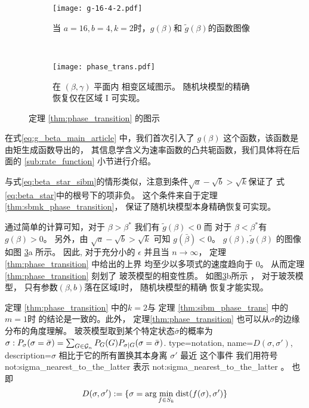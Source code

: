 \begin{figure}[H]
	\begin{subfigure}{0.43\textwidth}
		\texttt{[image: g-16-4-2.pdf]}
		\caption{当 $a=16,b=4,k=2$时，$g(\beta)$和
		$\tilde{g}(\beta)$的函数图像}\label{fig:g}
	\end{subfigure}~
	\begin{subfigure}{0.55\textwidth}
		\texttt{[image: phase\_trans.pdf]}
		\caption{
			在 $(\beta, \gamma)$ 平面内
			相变区域图示。
			随机块模型的精确
			恢复仅在区域 I 可实现。}\label{fig:pt}
	\end{subfigure}
	\caption{定理 \ref{thm:phase_transition}
	的图示}
	\label{fig:phase_transition_theorem_illustration}
\end{figure}
\begin{remark}
	在式\eqref{eq:g_beta_main_article} 中，我们首次引入了
	$g(\beta)$ 这个函数，该函数是由矩生成函数导出的，
	其信息学含义为速率函数的凸共轭函数，我们具体将在后面的 \ref{sub:rate_function} 小节进行介绍。
\end{remark}
与式\eqref{eq:beta_star_sibm}的情形类似，注意到条件$\sqrt{a} - \sqrt{b} > \sqrt{k}$保证了
式\eqref{eq:beta_star}中的根号下的项非负。
这个条件来自于定理\ref{thm:sbmk_phase_transition}，
保证了随机块模型本身精确恢复可实现。


通过简单的计算可知，对于 $\beta> \beta^*$ 我们有
$\tilde{g}(\beta) < 0$ 而 对于 $\beta < \beta^*$有
$g(\beta)>0$。
另外，由 $\sqrt{a} - \sqrt{b} > \sqrt{k}$ 可知
$g(\bar{\beta}) < 0$。
$g(\beta), \tilde{g}(\beta)$ 的图像
如图 \ref{fig:phase_transition_theorem_illustration}a 所示。
因此, 对于充分小的
$\epsilon$ 并且当 $n \to \infty$，
定理\ref{thm:phase_transition} 中给出的上界
均至少以多项式的速度趋向于 $0$。
从而定理\ref{thm:phase_transition} 
刻划了
玻茨模型的相变性质。
如图\ref{fig:phase_transition_theorem_illustration}b所示
， 对于玻茨模型， 只有参数$(\beta, b)$落在区域I时，
随机块模型的精确
恢复才能实现。



定理 \ref{thm:phase_transition} 中的$k=2$与
定理 \ref{thm:sibm_phase_trans} 中的$m=1$时
的结论是一致的。此外，
定理\ref{thm:phase_transition}
也可以从$\sigma$的边缘分布的角度理解。
玻茨模型取到某个特定状态$\bar{\sigma}$的概率为
 $\sigma: P_{\sigma}(\sigma =\bar{\sigma})
=\sum_{G \in \mathcal{G}_n}P_G(G)P_{\sigma |G}(\sigma=\bar{\sigma})$.
{
  type=notation,
  name={\ensuremath{D(\sigma, \sigma')}},
  description={$\sigma$ 相比于它的所有置换其本身离 $\sigma'$ 最近
  这个事件}
}
我们用符号 \gls{not:sigma_nearest_to_the_latter} 表示 \glsdesc{not:sigma_nearest_to_the_latter}
。
也即
\begin{equation}
	\label{eq:D_sigma_sigma_prime}
D(\sigma, \sigma') := \{ \sigma = \arg\min_{f \in S_k} \operatorname{dist}(f(\sigma), \sigma')  \}
\end{equation}

